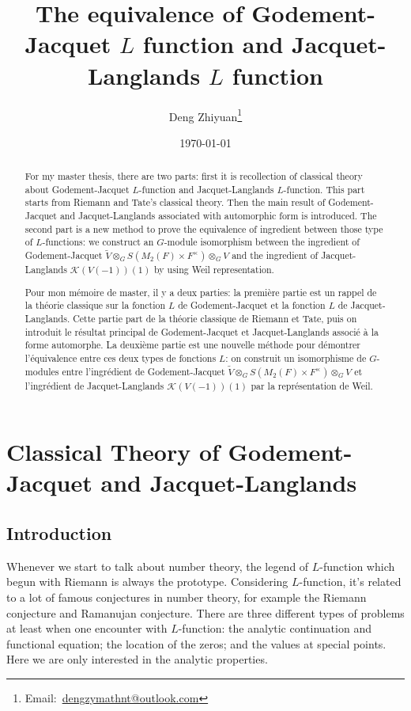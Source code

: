 \documentclass[12pt,a4paper,english]{article}
\title{The equivalence of Godement-Jacquet $L$ function and Jacquet-Langlands $L$ function}
\date{\today}
\author{Deng Zhiyuan\footnote{Email:\ \href{mailto:dengzymathnt@outlook.com}{dengzymathnt@outlook.com}}}
\theoremstyle{plain}
\theoremstyle{definition}
\begin{document}
\maketitle
\newpage

\tableofcontents
\newpage

\begin{abstract}
For my master thesis, there are two parts: first it is recollection of classical theory about Godement-Jacquet $L$-function and Jacquet-Langlands $L$-function. This part starts from Riemann and Tate's classical theory. Then the main result of Godement-Jacquet and Jacquet-Langlands associated with automorphic form is introduced. The second part is a new method to prove the equivalence of ingredient between those type of $L$-functions: we construct an $G$-module isomorphism between the ingredient of Godement-Jacquet $\widetilde{V}\otimes_{G}S(M_{2}(F)\times F^{\times})\otimes_{G}V$ and the ingredient of Jacquet-Langlands $\mathcal{K}(V(-1))(1)$ by using Weil representation.
\end{abstract}
\begin{abstract}
Pour mon mémoire de master, il y a deux parties: la première partie est un rappel de la théorie classique sur la fonction $L$ de Godement-Jacquet et la fonction $L$ de Jacquet-Langlands. Cette partie part de la théorie classique de Riemann et Tate, puis on introduit le résultat principal de Godement-Jacquet et Jacquet-Langlands associé à la forme automorphe. La deuxième partie est une nouvelle méthode pour démontrer l'équivalence entre ces deux types de fonctions $L$: on construit un isomorphisme de $G$-modules entre l'ingrédient de Godement-Jacquet $\widetilde{V}\otimes_{G}S( M_{2}(F)\times F^{\times})\otimes_{G}V$ et l'ingrédient de Jacquet-Langlands $\mathcal{K}(V(-1))(1)$ par la représentation de Weil.
\end{abstract}
\newpage

\vspace{0.5cm}
\section{Classical Theory of Godement-Jacquet and Jacquet-Langlands}
\subsection{Introduction}
Whenever we start to talk about number theory, the legend of $L$-function which begun with Riemann is always the prototype. Considering $L$-function, it's related to a lot of famous conjectures in number theory, for example the Riemann conjecture and Ramanujan conjecture. There are three different types of problems at least when one encounter with $L$-function: the analytic continuation and functional equation; the location of the zeros; and the values at special points. Here we are only interested in the analytic properties.
\end{document}
